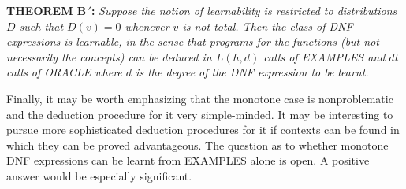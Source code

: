 \medskip
\noindent\textbf{THEOREM B\,$'$:} \emph{Suppose the notion of learnability is
restricted to distributions $D$ such that $D(v) = 0$
whenever $v$ is not total. Then the class of DNF
expressions is learnable, in the sense that programs
for the functions (but not necessarily the concepts)
can be deduced in $L(h,d)$ calls of EXAMPLES and \; $dt$
calls of ORACLE where $d$ is the degree of the DNF
expression to be learnt.}

\medskip

Finally, it may be worth emphasizing that the
monotone case is nonproblematic and the deduction
procedure for it very simple-minded. It may be
interesting to pursue more sophisticated deduction
procedures for it if contexts can be found in
which they can be proved advantageous. The
question as to whether monotone DNF expressions
can be learnt from EXAMPLES alone is open. A positive answer would be especially significant.
